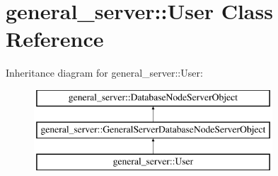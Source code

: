 \hypertarget{classgeneral__server_1_1User}{\section{general\-\_\-server\-:\-:\-User \-Class \-Reference}
\label{classgeneral__server_1_1User}
}
\-Inheritance diagram for general\-\_\-server\-:\-:\-User\-:\begin{figure}[H]
\begin{center}
\leavevmode
\includegraphics[height=3.000000cm]{classgeneral__server_1_1User}
\end{center}
\end{figure}
